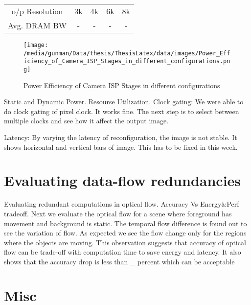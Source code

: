 \vspace{10mm}
\begin{tabular}{c|c|c|c|c}
	o/p Resolution & 3k & 4k & 6k & 8k \\
	Avg. DRAM BW & - & - & - & - \\
\end{tabular} 
\vspace{30mm}

\begin{figure*}
	\begin{center}
		\texttt{[image: /media/gunman/Data/thesis/ThesisLatex/data/images/Power\_Efficiency\_of\_Camera\_ISP\_Stages\_in\_different\_configurations.png]}
		\caption{Power Efficiency of Camera ISP Stages in different configurations}
		\label{fig:ex_4_9}
	\end{center}
	\vspace{-0.3in}
\end{figure*} 

Static and Dynamic Power. Resourse Utilization. 
Clock gating:
We were able to do clock gating of pixel clock. It works fine. The next step is to select between multiple clocks and see how it affect the output image.

Latency:
By varying the latency of reconfiguration, the image is not stable. It shows horizontal and vertical bars of image. This has to be fixed in this week. 


\section{Evaluating data-flow redundancies}
Evaluating redundant computations in optical flow. 
Accuracy Vs Energy\&Perf tradeoff. 
Next we evaluate the optical flow for a scene where foreground has movement and background is static. The temporal flow difference is found out to see the variation of flow. As expected we see the flow change only for the regions where the objects are moving. This observation suggests that accuracy of optical flow can be trade-off with computation time to save energy and latency. It also shows that the accuracy drop is less than \_ percent which can be acceptable


\section{Misc}

